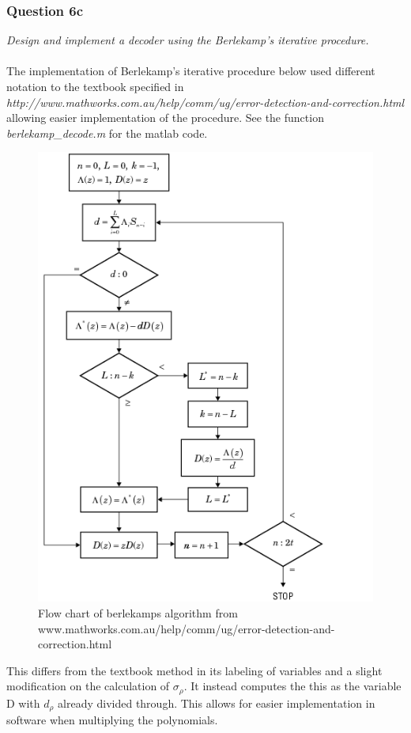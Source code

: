 \documentclass[a4paper]{article}
\begin{document}
\subsubsection{Question 6c} \textit{Design and implement a decoder using the Berlekamp’s iterative procedure.}\\
\\
The implementation of Berlekamp's iterative procedure below used different notation to the textbook specified in \textit{http://www.mathworks.com.au/help/comm/ug/error-detection-and-correction.html} allowing easier implementation of the procedure. See the function \textit{berlekamp\_decode.m} for the matlab code. 

\begin{figure}[H]
\centering
\includegraphics[scale=0.6]{berlekamp.png}
\caption{Flow chart of berlekamps algorithm from www.mathworks.com.au/help/comm/ug/error-detection-and-correction.html}
\end{figure}

This differs from the textbook method in its labeling of variables and a slight modification on the calculation of $\sigma_{\rho}$. It instead computes the this as the variable D with $d_{\rho}$ already divided through. This allows for easier implementation in software when multiplying the polynomials.
\end{document}
